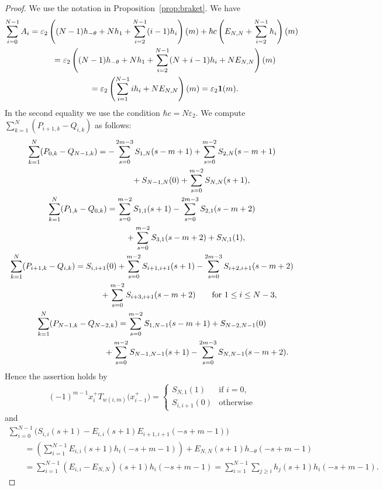 \documentclass[10pt,a4paper]{amsart}
\theoremstyle{definition}
\numberwithin{equation}{section}
\newcommand{\ve}{\varepsilon}
\newcommand{\bfid}{\mathbf{1}}
\begin{document}
\begin{proof} We use the notation in Proposition~\ref{prop:braket}. We have
\begin{gather*}
\sum_{i=0}^{N-1} A_i = \ve_2 \left((N-1)h_{-\theta} + N h_1 + \sum_{i=2}^{N-1}(i-1)h_i\right)(m) + \hbar c \left(E_{N,N}+\sum_{i=2}^{N-1} h_i\right)(m) \\
\hphantom{\sum_{i=0}^{N-1} A_i}{} = \ve_2 \left( (N-1)h_{-\theta} + Nh_1 + \sum_{i=2}^{N-1} (N+i-1) h_i + NE_{N,N} \right)(m) \\
\hphantom{\sum_{i=0}^{N-1} A_i}{} = \ve_2 \left( \sum_{i=1}^{N-1} i h_i + NE_{N,N}\right)(m)=\ve_2 \bfid(m).
\end{gather*}
In the second equality we use the condition $\hbar c = N\ve_2$. We compute $\sum\limits_{k=1}^{N} (P_{i+1,k}-Q_{i,k})$ as follows:
\begin{gather*}
\sum_{k=1}^{N} (P_{0,k}-Q_{N-1,k}) = - \sum_{s=0}^{2m-3}S_{1,N}(s-m+1) + \sum_{s=0}^{m-2}S_{2,N}(s-m+1)\\
\hphantom{\sum_{k=1}^{N} (P_{0,k}-Q_{N-1,k})=}{} +S_{N-1,N}(0)+\sum_{s=0}^{m-2} S_{N,N}(s+1),
\\
\sum_{k=1}^{N} (P_{1,k}-Q_{0,k}) = \sum_{s=0}^{m-2} S_{1,1}(s+1) - \sum_{s=0}^{2m-3}S_{2,1}(s-m+2) \\
\hphantom{\sum_{k=1}^{N} (P_{1,k}-Q_{0,k}) =}{} + \sum_{s=0}^{m-2}S_{3,1}(s-m+2)+S_{N,1}(1),
\\
\sum_{k=1}^{N} (P_{i+1,k}-Q_{i,k}) = S_{i,i+1}(0) + \sum_{s=0}^{m-2} S_{i+1,i+1}(s+1)- \sum_{s=0}^{2m-3}S_{i+2,i+1}(s-m+2) \\
\hphantom{\sum_{k=1}^{N} (P_{i+1,k}-Q_{i,k}) =}{} + \sum_{s=0}^{m-2}S_{i+3,i+1}(s-m+2) \qquad \text{for}\ 1 \leq i \leq N-3,
\\
\sum_{k=1}^{N} (P_{N-1,k}-Q_{N-2,k})= \sum_{s=0}^{m-2}S_{1,N-1}(s-m+1)+S_{N-2,N-1}(0)\\
\hphantom{\sum_{k=1}^{N} (P_{N-1,k}-Q_{N-2,k})=}{} +\sum_{s=0}^{m-2} S_{N-1,N-1}(s+1) - \sum_{s=0}^{2m-3}S_{N,N-1}(s-m+2).
\end{gather*}
Hence the assertion holds by
\begin{gather*}
(-1)^{m-1} x_i^+ T_{w(i,m)}\big(x_{i-1}^+\big) = \begin{cases}
S_{N,1}(1) & \text{if $i=0$,}\\
S_{i,i+1}(0) & \text{otherwise}
\end{cases}
\end{gather*}
and
\begin{gather*}
\sum_{i=0}^{N-1} \big( S_{i,i}(s+1) - E_{i,i}(s+1) E_{i+1,i+1}(-s+m-1) \big) \\
\qquad{}= \left( \sum_{i=1}^{N-1} E_{i,i}(s+1) h_{i}(-s+m-1) \right)+ E_{N,N}(s+1)h_{-\theta}(-s+m-1)\\
\qquad{} = \sum_{i=1}^{N-1} (E_{i,i}-E_{N,N})(s+1) h_{i}(-s+m-1) = \sum_{i=1}^{N-1} \sum_{j \geq i} h_j(s+1) h_i(-s+m-1).\tag*{\qed}
\end{gather*}\renewcommand{\qed}{}
\end{proof}
\end{document}
